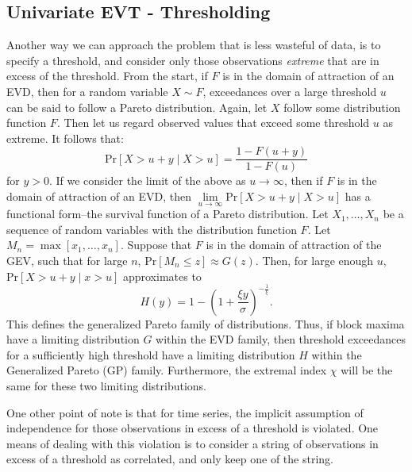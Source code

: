 \subsection{Univariate EVT - Thresholding}
Another way we can approach the problem that is less wasteful of data, is to specify a threshold,
  and consider only those observations \emph{extreme} that are in excess of the threshold.  From the
  start, if $F$ is in the domain of attraction of an EVD, then for a random variable $X\sim F$,
  exceedances over a large threshold $u$ can be said to follow a Pareto distribution.  Again, let
  $X$ follow some distribution function $F$. Then let us regard observed values that exceed some
  threshold $u$ as extreme.  It follows that:
  \begin{equation*}
    \text{Pr}\left[X > u + y\mid X > u\right] = \frac{1 - F(u + y)}{1 - F(u)}
  \end{equation*}
  for $y > 0$.  If we consider the limit of the above as $u\to\infty$, then if $F$ is in the domain
  of attraction of an EVD, then $\lim\limits_{u\to\infty}\text{Pr}\left[X > u + y\mid X > u\right]$
  has a functional form--the survival function of a Pareto distribution. Let $X_1,\ldots,X_n$ be a
  sequence of random variables with the distribution function $F$.  Let $M_n = \max[x_1,\ldots,x_n]$.
  Suppose that $F$ is in the domain of attraction of the GEV, such that for large $n$,
  $\text{Pr}[M_n \leq z]\approx G(z)$.  Then, for large enough $u$, $\text{Pr}[X > u+y\mid x > u]$
  approximates to
  \begin{equation*}
    \label{eqn:gp}
    H(y) = 1 - \left(1 + \frac{\xi y}{\sigma}\right)^{-\frac{1}{\xi}}.
  \end{equation*}
  This defines the generalized Pareto family of distributions.  Thus, if block maxima have a
  limiting distribution $G$ within the EVD family, then threshold exceedances for a sufficiently
  high threshold have a limiting distribution $H$ within the Generalized Pareto (GP) family.
  Furthermore, the extremal index $\chi$ will be the same for these two limiting distributions.

One other point of note is that for time series, the implicit assumption of independence for those
  observations in excess of a threshold is violated.  One means of dealing with this violation is
  to consider a string of observations in excess of a threshold as correlated, and only keep one
  of the string.

